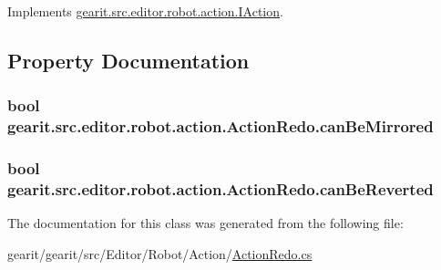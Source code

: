 Implements \hyperlink{interfacegearit_1_1src_1_1editor_1_1robot_1_1action_1_1_i_action_a8a84360c15fcd7d0f60ff7aef2dca980}{gearit.\+src.\+editor.\+robot.\+action.\+I\+Action}.



\subsection{Property Documentation}
\hypertarget{classgearit_1_1src_1_1editor_1_1robot_1_1action_1_1_action_redo_ab5222aae86c8fc358a8f338e96ef13ec}{
\subsubsection[{can\+Be\+Mirrored}]{\setlength{\rightskip}{0pt plus 5cm}bool gearit.\+src.\+editor.\+robot.\+action.\+Action\+Redo.\+can\+Be\+Mirrored\hspace{0.3cm}{\ttfamily [get]}}}\label{classgearit_1_1src_1_1editor_1_1robot_1_1action_1_1_action_redo_ab5222aae86c8fc358a8f338e96ef13ec}
\hypertarget{classgearit_1_1src_1_1editor_1_1robot_1_1action_1_1_action_redo_ab001dda2883ca12b60dfac14e0bcb607}{
\subsubsection[{can\+Be\+Reverted}]{\setlength{\rightskip}{0pt plus 5cm}bool gearit.\+src.\+editor.\+robot.\+action.\+Action\+Redo.\+can\+Be\+Reverted\hspace{0.3cm}{\ttfamily [get]}}}\label{classgearit_1_1src_1_1editor_1_1robot_1_1action_1_1_action_redo_ab001dda2883ca12b60dfac14e0bcb607}


The documentation for this class was generated from the following file\+:\begin{DoxyCompactItemize}
\item 
gearit/gearit/src/\+Editor/\+Robot/\+Action/\hyperlink{_robot_2_action_2_action_redo_8cs}{Action\+Redo.\+cs}\end{DoxyCompactItemize}
